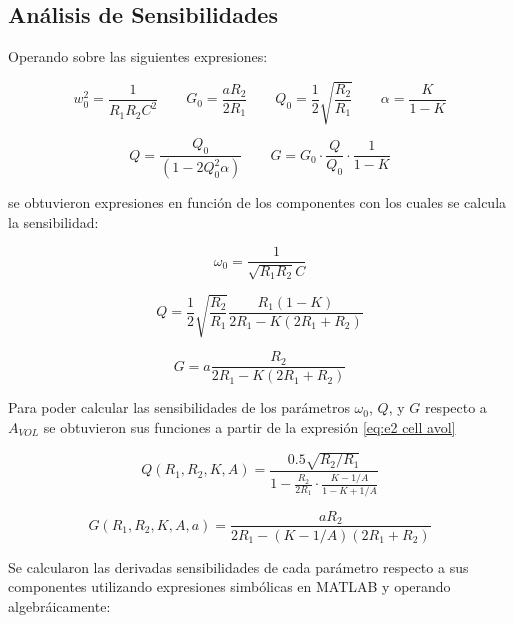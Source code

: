 {\subsection{Análisis de Sensibilidades}

Operando sobre las siguientes expresiones:

\begin{equation*}
w_0^2=\frac{1}{R_1R_2C^2} \qquad G_0 = \frac{aR_2}{2R_1} \qquad Q_0=\frac{1}{2}\sqrt{\frac{R_2}{R_1}} \qquad	\alpha=\frac{K}{1-K}
\end{equation*}

\begin{equation*}
Q = \frac{Q_0}{\left(1-2 Q_0^2\alpha\right)} \qquad	G=G_0\cdot\frac{Q}{Q_0}\cdot\frac{1}{1-K}
\end{equation*}

se obtuvieron expresiones en función de los componentes con los cuales se calcula la sensibilidad:

\begin{equation}
\omega_0 = \frac{1}{\sqrt{R_1 R_2}C}
\end{equation}

\begin{equation}
Q=\frac{1}{2} \sqrt{\frac{R_2}{R_1}} \frac{R_1(1-K)}{2R_1-K(2R_1+R_2)}
\end{equation}

\begin{equation}
G=a\frac{R_2}{2R_1-K(2R_1+R_2)}
\end{equation}

Para poder calcular las sensibilidades de los parámetros $\omega_0$, $Q$, y $G$ respecto a $A_{VOL}$ se obtuvieron sus funciones a partir de la expresión \eqref{eq:e2 cell avol}

\begin{equation}
Q (R_1,R_2,K,A)= \frac{0.5 \sqrt{R_2/R_1}}{1 - \frac{R_2}{2R_1}\cdot \frac{K-1/A}{1-K+1/A}}
\end{equation}

\begin{equation}
G (R_1,R_2,K,A,a) = \frac{a R_2}{2R_1-(K-1/A)(2R_1+R_2)}
\end{equation}

Se calcularon las derivadas sensibilidades de cada parámetro respecto a sus componentes utilizando expresiones simbólicas en MATLAB y operando algebráicamente:

}
